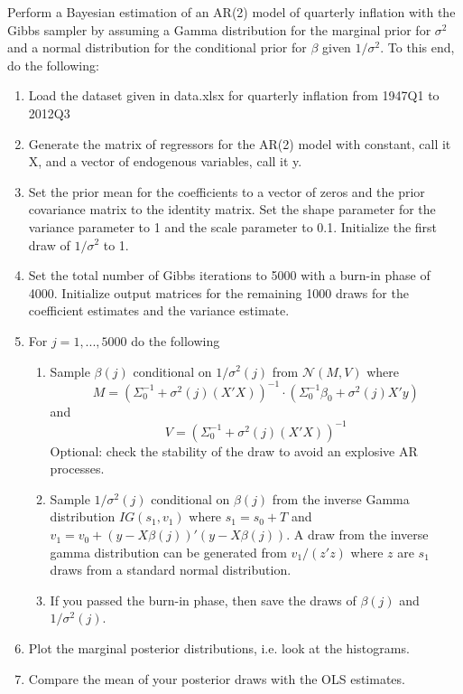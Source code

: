 Perform a Bayesian estimation of an AR(2) model of quarterly inflation with the Gibbs sampler by assuming a Gamma distribution for the marginal prior for $\sigma^2$ and a normal distribution for the conditional prior for $\beta$ given $1/\sigma^2$. To this end, do the following:
\begin{enumerate}
    \item Load the dataset given in data.xlsx for quarterly inflation from 1947Q1 to 2012Q3

    \item Generate the matrix of regressors for the AR(2) model with constant, call it X, and a vector of endogenous variables, call it y.

    \item Set the prior mean for the coefficients to a vector of zeros and the prior covariance matrix to the identity matrix. Set the shape parameter for the variance parameter to 1 and the scale parameter to 0.1. Initialize the first draw of $1/\sigma^2$ to 1.

    \item Set the total number of Gibbs iterations to 5000 with a burn-in phase of 4000. Initialize output matrices for the remaining 1000 draws for the coefficient estimates and the variance estimate.

    \item For $j=1,...,5000$ do the following
          \begin{enumerate}
              \item Sample $\beta(j)$ conditional on $1/\sigma^2(j)$ from $\mathcal{N}(M,V)$ where
                    $$M=(\Sigma_0^{-1}+\sigma^2(j) (X'X))^{-1} \cdot (\Sigma_0^{-1}\beta_0+\sigma^2(j) X'y)$$ and
                    $$V=(\Sigma_0^{-1} +\sigma^2(j)(X'X))^{-1}$$
                    Optional: check the stability of the draw to avoid an explosive AR processes.

              \item Sample $1/\sigma^2(j)$ conditional on $\beta(j)$ from the inverse Gamma distribution $IG(s_1,v_1)$ where $s_1 = s_0 + T$ and $v_1 = v_0 + (y-X\beta(j))'(y-X\beta(j))$. A draw from the inverse gamma distribution can be generated from $v_1/(z' z)$ where $z$ are $s_1$ draws from a standard normal distribution.

              \item If you passed the burn-in phase, then save the draws of $\beta(j)$ and $1/\sigma^2(j)$.
          \end{enumerate}

    \item Plot the marginal posterior distributions, i.e. look at the histograms.

    \item Compare the mean of your posterior draws with the OLS estimates.
\end{enumerate}

